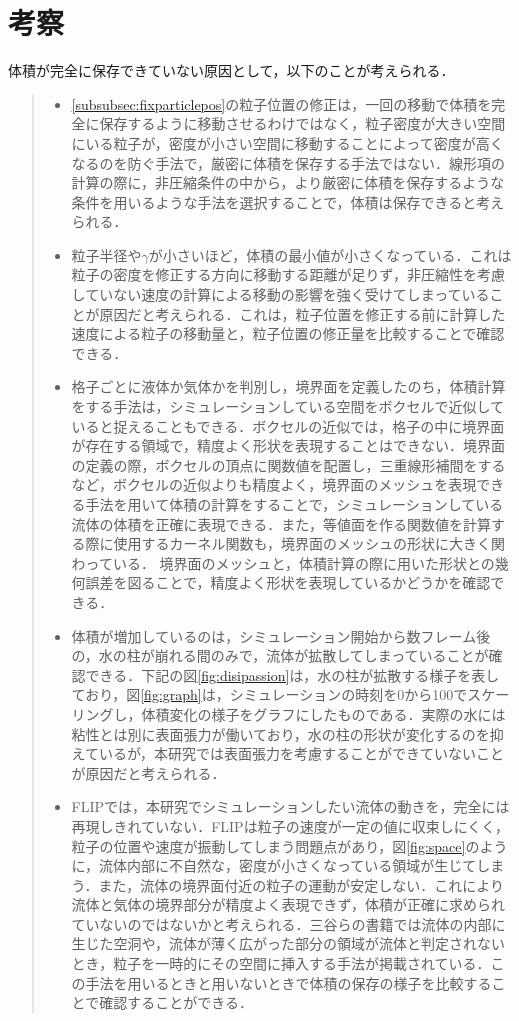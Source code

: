 \documentclass[a4j,12pt]{jreport}
\begin{document}
\section{考察} \label{sec:exp_consideration}
体積が完全に保存できていない原因として，以下のことが考えられる．
\begin{quote}
	\begin{itemize}
		\item \ref{subsubsec:fixparticlepos}の粒子位置の修正は，一回の移動で体積を完全に保存するように移動させるわけではなく，粒子密度が大きい空間にいる粒子が，密度が小さい空間に移動することによって密度が高くなるのを防ぐ手法で，厳密に体積を保存する手法ではない．線形項の計算の際に，非圧縮条件の中から，より厳密に体積を保存するような条件を用いるような手法を選択することで，体積は保存できると考えられる．
		\item 粒子半径や$\gamma$が小さいほど，体積の最小値が小さくなっている．これは粒子の密度を修正する方向に移動する距離が足りず，非圧縮性を考慮していない速度の計算による移動の影響を強く受けてしまっていることが原因だと考えられる．これは，粒子位置を修正する前に計算した速度による粒子の移動量と，粒子位置の修正量を比較することで確認できる．
		\item 格子ごとに液体か気体かを判別し，境界面を定義したのち，体積計算をする手法は，シミュレーションしている空間をボクセルで近似していると捉えることもできる．ボクセルの近似では，格子の中に境界面が存在する領域で，精度よく形状を表現することはできない．境界面の定義の際，ボクセルの頂点に関数値を配置し，三重線形補間をするなど，ボクセルの近似よりも精度よく，境界面のメッシュを表現できる手法を用いて体積の計算をすることで，シミュレーションしている流体の体積を正確に表現できる．また，等値面を作る関数値を計算する際に使用するカーネル関数も，境界面のメッシュの形状に大きく関わっている．
境界面のメッシュと，体積計算の際に用いた形状との幾何誤差を図ることで，精度よく形状を表現しているかどうかを確認できる．		\item 体積が増加しているのは，シミュレーション開始から数フレーム後の，水の柱が崩れる間のみで，流体が拡散してしまっていることが確認できる．下記の図\ref{fig:disipassion}は，水の柱が拡散する様子を表しており，図\ref{fig:graph}は，シミュレーションの時刻を0から100でスケーリングし，体積変化の様子をグラフにしたものである．実際の水には粘性とは別に表面張力が働いており，水の柱の形状が変化するのを抑えているが，本研究では表面張力を考慮することができていないことが原因だと考えられる．
		\item FLIPでは，本研究でシミュレーションしたい流体の動きを，完全には再現しきれていない．FLIPは粒子の速度が一定の値に収束しにくく，粒子の位置や速度が振動してしまう問題点があり，図\ref{fig:space}のように，流体内部に不自然な，密度が小さくなっている領域が生じてしまう．また，流体の境界面付近の粒子の運動が安定しない．これにより流体と気体の境界部分が精度よく表現できず，体積が正確に求められていないのではないかと考えられる．三谷らの書籍\cite{book}では流体の内部に生じた空洞や，流体が薄く広がった部分の領域が流体と判定されないとき，粒子を一時的にその空間に挿入する手法が掲載されている．この手法を用いるときと用いないときで体積の保存の様子を比較することで確認することができる．
	\end{itemize}
\end{quote}
\end{document}
